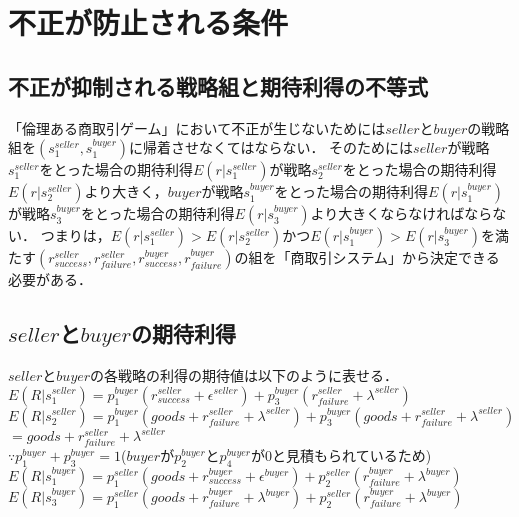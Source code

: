 \section{不正が防止される条件}
\subsection{不正が抑制される戦略組と期待利得の不等式}
「倫理ある商取引ゲーム」において不正が生じないためには$seller$と$buyer$の戦略組を$(s^{seller}_1, s^{buyer}_1)$に帰着させなくてはならない．
そのためには$seller$が戦略$s^{seller}_1$をとった場合の期待利得$E(r|s^{seller}_1)$が戦略$s^{seller}_2$をとった場合の期待利得$E(r|s^{seller}_2)$より大きく，$buyer$が戦略$s^{buyer}_1$をとった場合の期待利得$E(r|s^{buyer}_1)$が戦略$s^{buyer}_3$をとった場合の期待利得$E(r|s^{buyer}_3)$より大きくならなければならない．
つまりは，$E(r|s^{seller}_1) > E(r|s^{seller}_2)$かつ$E(r|s^{buyer}_1) > E(r|s^{buyer}_3)$を満たす$(r^{seller}_{success}, r^{seller}_{failure}, r^{buyer}_{success}, r^{buyer}_{failure})$の組を「商取引システム」から決定できる必要がある．

\subsection{$ seller $と$ buyer $の期待利得}

$ seller $と$ buyer $の各戦略の利得の期待値は以下のように表せる．\\


$ E(R|s^{seller}_1) = p^{buyer}_1 (r^{seller}_{success} + \epsilon^{seller}) + p^{buyer}_3 (r^{seller}_{failure} + \lambda^{seller}) $ \\

$ E(R|s^{seller}_2) = p^{buyer}_1 (goods + r^{seller}_{failure} + \lambda^{seller}) + p^{buyer}_3 (goods + r^{seller}_{failure} + \lambda^{seller}) $ \\

$ = goods + r^{seller}_{failure} + \lambda^{seller} $ \\

$ \because p^{buyer}_1 + p^{buyer}_3 = 1 $($ buyer $が$ p^{buyer}_2 $と$ p^{buyer}_4 $が0と見積もられているため) \\

$ E(R|s^{buyer}_1) = p^{seller}_1 (goods + r^{buyer}_{success} + \epsilon^{buyer}) + p^{seller}_2 (r^{buyer}_{failure} + \lambda^{buyer}) $ \\

$ E(R|s^{buyer}_3) = p^{seller}_1(goods+r^{buyer}_{failure} + \lambda^{buyer}) + p^{seller}_2 (r^{buyer}_{failure} + \lambda^{buyer}) $ \\

